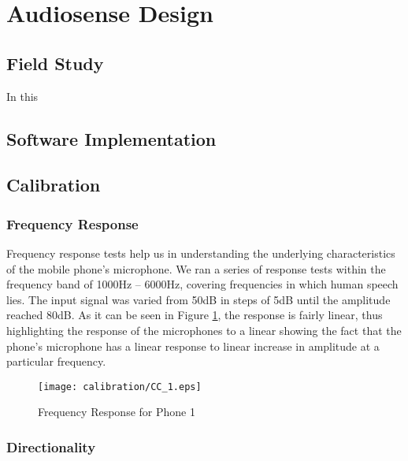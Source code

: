 \section{Audiosense Design}
\subsection{Field Study}
In this \cite{hasan:PH14}
\subsection{Software Implementation}
\subsection{Calibration}
\subsubsection{Frequency Response}
Frequency response tests help us in understanding the underlying characteristics of the mobile phone's microphone. We ran a series of response tests within the frequency band of 1000Hz -- 6000Hz, covering frequencies in which human speech lies. The input signal was varied from 50dB in steps of 5dB until the amplitude reached 80dB. As it can be seen in Figure \ref{fig:calibration_phone1}, the response is fairly linear, thus highlighting the response of the microphones to a linear 
showing the fact that the phone's microphone has a linear response to linear increase in amplitude at a particular frequency.
\begin{figure}[h]
\captionsetup{justification=centering}
\begin{center}
\texttt{[image: calibration/CC\_1.eps]}
\caption{Frequency Response for Phone 1}
\label{fig:calibration_phone1}
\end{center}
\end{figure} 
\subsubsection{Directionality}